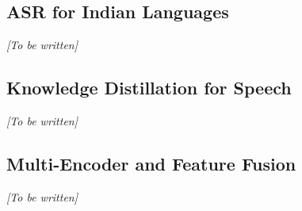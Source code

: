\documentclass{article} %
\begin{document}
\subsection{ASR for Indian Languages}
\textit{[To be written]}

\subsection{Knowledge Distillation for Speech}
\textit{[To be written]}

\subsection{Multi-Encoder and Feature Fusion}
\textit{[To be written]}

%
%
%
%
%
\end{document}
